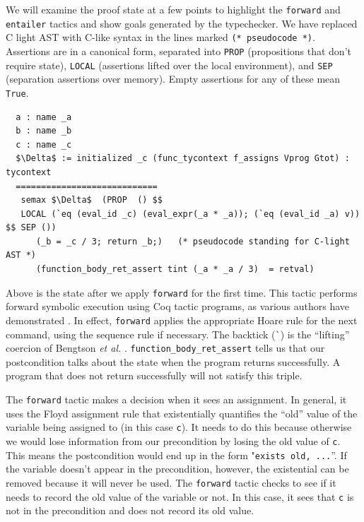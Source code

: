 \documentclass{puthesis}
\begin{document}
We will examine the proof state at a few points to highlight the
\lstinline|forward| and \lstinline|entailer| tactics and show goals generated by
the typechecker. We have replaced C light AST with C-like syntax in the lines
marked \lstinline|(* pseudocode *)|. Assertions are in a canonical form,
separated into \lstinline|PROP| (propositions that don't require state), \lstinline|LOCAL| (assertions lifted over the local environment), and
\lstinline|SEP| (separation assertions over memory). Empty assertions for any of
these mean \lstinline|True|.

\begin{lstlisting}
  a : name _a
  b : name _b
  c : name _c
  $\Delta$ := initialized _c (func_tycontext f_assigns Vprog Gtot) : tycontext
  ============================
   semax $\Delta$  (PROP  () $$ 
   LOCAL (`eq (eval_id _c) (eval_expr(_a * _a)); (`eq (eval_id _a) v)) $$ SEP ()) 
      (_b = _c / 3; return _b;)   (* pseudocode standing for C-light AST *) 
      (function_body_ret_assert tint (_a * _a / 3)  = retval)
\end{lstlisting}

Above is the state after we apply \lstinline|forward| for the first time.  This tactic
performs forward symbolic execution using Coq tactic programs, as
various authors have demonstrated
\cite{appel06,chlipala11:pldi,bengtson12,mccreight09}. In effect,
\lstinline|forward| applies the appropriate Hoare rule for the next command,
using the sequence rule if necessary. The backtick (\lstinline|`|) is the
``lifting'' coercion of Bengtson \emph{et al.} \cite{bengtson12}. 
\lstinline|function_body_ret_assert| tells us that our
postcondition talks about the state when the program returns successfully. A
program that does not return successfully will not satisfy this triple.

The \lstinline|forward| tactic makes a decision when it sees an assignment. In
general, it uses the Floyd assignment rule that existentially quantifies the
``old'' value of the variable being assigned to (in this case \lstinline|c|). It
needs to do this because otherwise we would lose information from our
precondition by losing the old value of \lstinline|c|. This means the
postcondition would end up in the form "\lstinline|exists old, ...|''. If the
variable doesn't appear in the precondition, however, the existential can be
removed because it will never be used. The \lstinline|forward| tactic checks to
see if it needs to record the old value of the variable or not. In this case,
it sees that \lstinline|c| is not in the precondition and does not record its
old value.
\end{document}

